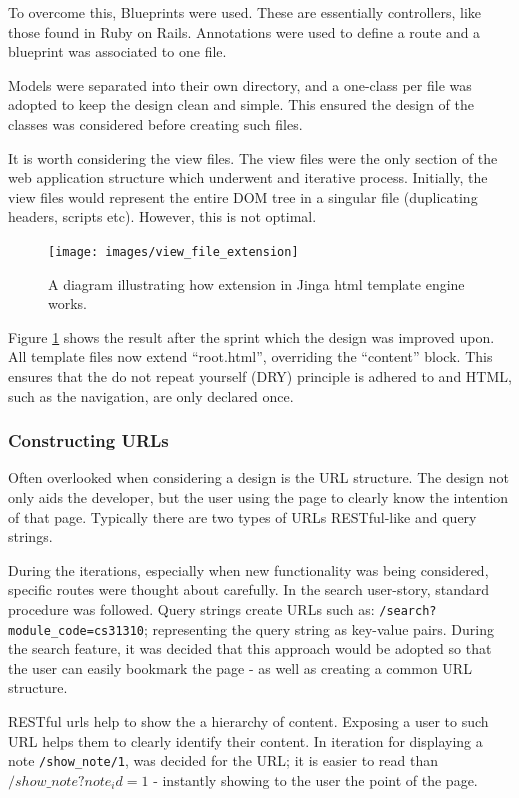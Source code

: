 To overcome this, Blueprints were used. These are essentially controllers, like those found in Ruby on Rails. Annotations were used to define a route and a blueprint was associated to one file.

Models were separated into their own directory, and a one-class per file was adopted to keep the design clean and simple. This ensured the design of the classes was considered before creating such files.

It is worth considering the view files. The view files were the only section of the web application structure which underwent and iterative process. Initially, the view files would represent the entire DOM tree in a singular file (duplicating headers, scripts etc). However, this is not optimal.

\begin{figure}[H]
  \centering
  \texttt{[image: images/view\_file\_extension]}
  \caption{A diagram illustrating how extension in Jinga html template engine works.}
  \label{fig:extension}
\end{figure}

Figure \ref{fig:extension} shows the result after the sprint which the design was improved upon. All template files now extend ``root.html'', overriding the ``content'' block. This ensures that the do not repeat yourself (DRY) principle is adhered to and HTML, such as the navigation, are only declared once.

\subsubsection{Constructing URLs}
Often overlooked when considering a design is the URL structure. The design not only aids the developer, but the user using the page to clearly know the intention of that page. Typically there are two types of URLs RESTful-like and query strings.

During the iterations, especially when new functionality was being considered, specific routes were thought about carefully. In the search user-story, standard procedure was followed. Query strings create URLs such as: \texttt{/search?module\_code=cs31310}; representing the query string as key-value pairs. During the search feature, it was decided that this approach would be adopted so that the user can easily bookmark the page - as well as creating a common URL structure.

RESTful urls help to show the a hierarchy of content. Exposing a user to such URL helps them to clearly identify their content. In iteration for displaying a note \texttt{/show\_note/1}, was decided for the URL; it is easier to read than  \texttt{$/show\_note?note_id=1$} - instantly showing to the user the point of the page.

